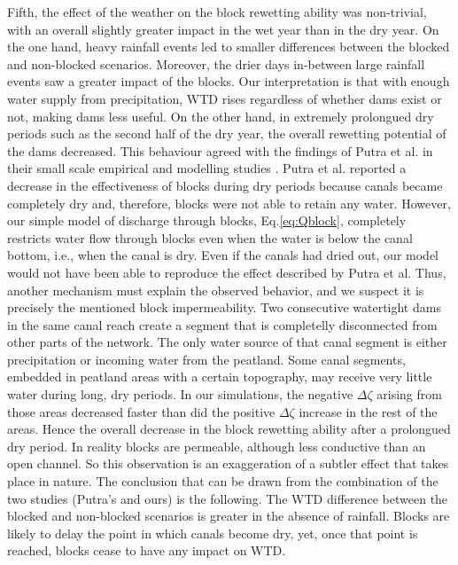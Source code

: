 \documentclass[bg, manuscript]{copernicus}
\begin{document}
Fifth, the effect of the weather on the block rewetting ability was non-trivial, with an overall slightly greater impact in the wet year than in the dry year.
On the one hand, heavy rainfall events led to smaller differences between the blocked and non-blocked scenarios.
Moreover, the drier days in-between large rainfall events saw a greater impact of the blocks.
Our interpretation is that with enough water supply from precipitation, WTD rises regardless of whether dams exist or not, making dams less useful.
On the other hand, in extremely prolongued dry periods such as the second half of the dry year, the overall rewetting potential of the dams decreased.
This behaviour agreed with the findings of Putra et al. in their small scale empirical and modelling studies \citep{putraEffectsDitchDams2021, putraModellingPerformanceBunds2022}.
Putra et al. reported a decrease in the effectiveness of blocks during dry periods because canals became completely dry and, therefore, blocks were not able to retain any water.
However, our simple model of discharge through blocks, Eq.\eqref{eq:Qblock}, completely restricts water flow through blocks even when the water is below the canal bottom, i.e., when the canal is dry.
Even if the canals had dried out, our model would not have been able to reproduce the effect described by Putra et al.
Thus, another mechanism must explain the observed behavior, and we suspect it is precisely the mentioned block impermeability.
Two consecutive watertight dams in the same canal reach create a segment that is completelly disconnected from other parts of the network.
The only water source of that canal segment is either precipitation or incoming water from the peatland.
Some canal segments, embedded in peatland areas with a certain topography, may receive very little water during long, dry periods.
In our simulations, the negative $\Delta \zeta$ arising from those areas decreased faster than did the positive $\Delta \zeta$ increase in the rest of the areas.
Hence the overall decrease in the block rewetting ability after a prolongued dry period.
In reality blocks are permeable, although less conductive than an open channel.
So this observation is an exaggeration of a subtler effect that takes place in nature.
The conclusion that can be drawn from the combination of the two studies (Putra's and ours) is the following.
The WTD difference between the blocked and non-blocked scenarios is greater in the absence of rainfall.
Blocks are likely to delay the point in which canals become dry, yet, once that point is reached, blocks cease to have any impact on WTD.
\end{document}
